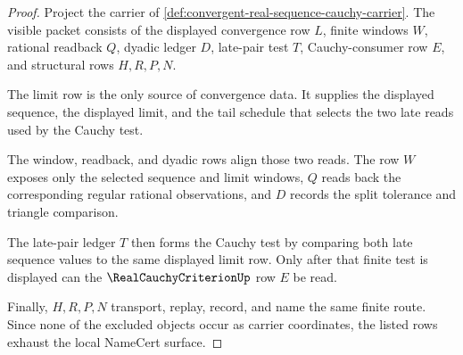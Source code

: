 \begin{proof}
Project the carrier of \autoref{def:convergent-real-sequence-cauchy-carrier}. The visible packet consists of the displayed convergence row $L$, finite windows $W$, rational readback $Q$, dyadic ledger $D$, late-pair test $T$, Cauchy-consumer row $E$, and structural rows $H,R,P,N$.

The limit row is the only source of convergence data. It supplies the displayed sequence, the displayed limit, and the tail schedule that selects the two late reads used by the Cauchy test.

The window, readback, and dyadic rows align those two reads. The row $W$ exposes only the selected sequence and limit windows, $Q$ reads back the corresponding regular rational observations, and $D$ records the split tolerance and triangle comparison.

The late-pair ledger $T$ then forms the Cauchy test by comparing both late sequence values to the same displayed limit row. Only after that finite test is displayed can the $\RealCauchyCriterionUp$ row $E$ be read.

Finally, $H,R,P,N$ transport, replay, record, and name the same finite route. Since none of the excluded objects occur as carrier coordinates, the listed rows exhaust the local NameCert surface.
\end{proof}

